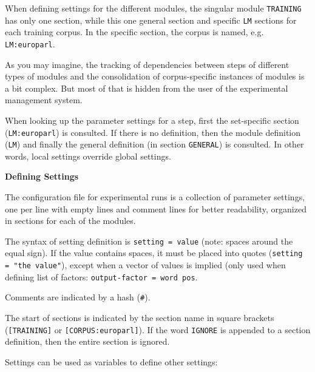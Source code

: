 When defining settings for the different modules, the singular module {\tt TRAINING} has only one section, while this one general section and specific {\tt LM} sections for each training corpus. In the specific section, the corpus is named, e.g. {\tt LM:europarl}.



As you may imagine, the tracking of dependencies between steps of different types of modules and the consolidation of corpus-specific instances of modules is a bit complex. But most of that is hidden from the user of the experimental management system.



When looking up the parameter settings for a step, first the set-specific section ({\tt LM:europarl}) is consulted. If there is no definition, then the module definition ({\tt LM}) and finally the general definition (in section {\tt GENERAL}) is consulted. In other words, local settings override global settings.



\label{experiment-perl.texdef-settings}


\vspace{2mm}

{\bf 
\label{experiment-perl.texntoc19}Defining Settings}


The configuration file for experimental runs is a collection of parameter settings, one per line with empty lines and comment lines for better readability, organized in sections for each of the modules.



The syntax of setting definition is {\tt setting = value} (note: spaces around the equal sign). If the value contains spaces, it must be placed into quotes ({\tt setting = "the value"}), except when a vector of values is implied (only used when defining list of factors: {\tt output-factor = word pos}. 



Comments are indicated by a hash ({\tt \#}). 



The start of sections is indicated by the section name in square brackets ({\tt [TRAINING]} or {\tt [CORPUS:europarl]}). If the word {\tt IGNORE} is appended to a section definition, then the entire section is ignored.



Settings can be used as variables to define other settings:

\colorbox{gray}{%
}

